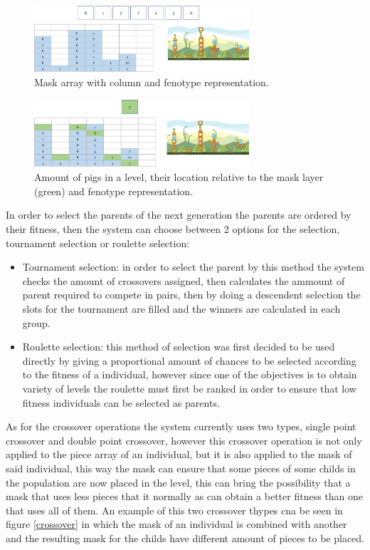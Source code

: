 \documentclass[conference]{IEEEtran}
\begin{document}
\begin{figure}[htbp]
    \centerline{\includegraphics[width=80mm]{Images/mask_layer.png}}
    \caption{Mask array with column and fenotype representation.}
    \label{mask_layer}
\end{figure}

\begin{figure}[htbp]
    \centerline{\includegraphics[width=80mm]{Images/enemy_layer.png}}
    \caption{Amount of pigs in a level, their location relative to the mask layer (green) and fenotype representation.}
    \label{enemy_layer}
\end{figure}

In order to select the parents of the next generation the parents are ordered by their fitness, then the system can choose between 2 options for the selection, tournament selection or roulette selection:

\begin{itemize}
    \item Tournament selection: in order to select the parent by this method the system checks the amount of crossovers assigned, then calculates the ammount of parent required to compete in pairs, then by doing a descendent selection the slots for the tournament are filled and the winners are calculated in each group.
    \item Roulette selection: this method of selection was first decided to be used directly by giving a proportional amount of chances to be selected according to the fitness of a individual, however since one of the objectives is to obtain variety of levels the roulette must first be ranked in order to ensure that low fitness individuals can be selected as parents.
\end{itemize}

As for the crossover operations the system currently uses two types, single point crossover and double point crossover, however this crossover operation is not only applied to the piece array of an individual, but it is also applied to the mask of said individual, this way the mask can ensure that some pieces of some childs in the population are now placed in the level, this can bring the possibility that a mask that uses less pieces that it normally as can obtain a better fitness than one that uses all of them. An example of this two crossover thypes cna be seen in figure \ref{crossover} in which the mask of an individual is combined with another and the resulting mask for the childs have different amount of pieces to be placed.
\end{document}
